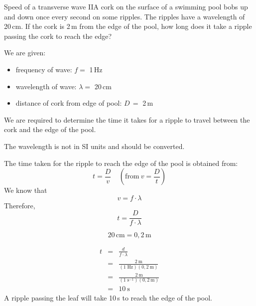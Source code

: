 \begin{wex}{Speed of a transverse wave II}{A cork on the surface of a swimming pool bobs up and down once every second on some ripples. The ripples have a wavelength of 20\,cm. If the cork is 2\,m from the edge of the pool, how long does it take a ripple passing the cork to reach the edge?}{
We are given:
\begin{itemize}
\item{frequency of wave: $f =$ 1\,Hz}
\item{wavelength of wave: $\lambda =$ 20\,cm}
\item{distance of cork from edge of pool: $D\,=$ 2\,m}
\end{itemize}
We are required to determine the time it takes for a ripple to travel between the cork and the edge of the pool.

The wavelength is not in SI units and should be converted.

The time taken for the ripple to reach the edge of the pool is obtained from:
$$t=\frac{D}{v} \ \ \ \ \ (\text{from}\ v=\frac{D}{t})$$
We know that
\begin{equation*}v=f\cdot \lambda\end{equation*}
Therefore,
\begin{equation}t=\frac{D}{f\cdot \lambda}\end{equation}

\begin{equation*}20\,\text{cm}=0,2\,\text{m}\end{equation*}

\begin{eqnarray*}
t&=&\frac{d}{f\cdot \lambda}\\
&=&\frac{2~\text{m}}{(1\;\text{Hz})(0,2~\text{m})}\\
&=&\frac{2~\text{m}}{(1\;\text{s}^{-1})(0,2~\text{m})}\\
&=&10\ \text{s}
\end{eqnarray*}
A ripple passing the leaf will take 10\,s to reach the edge of the pool.}
\end{wex}

